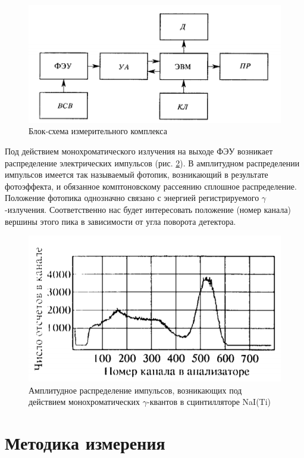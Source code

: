 \documentclass[reprint, nofootinbib, nobalancelastpage, 10pt]{revtex4-2}
\begin{document}
\begin{figure}[h!]
	\includegraphics[width = \linewidth]{pic2.png}
	\caption{Блок-схема измерительного комплекса}
	\label{img:pic2}
\end{figure}

Под действием монохроматического излучения на выходе ФЭУ возникает распределение
электрических импульсов (рис. \ref{img:pic3}). В амплитудном распределении импульсов
имеется так называемый фотопик, возникающий в результате фотоэффекта, и обязанное
комптоновскому рассеянию сплошное распределение. Положение фотопика однозначно связано с
энергией регистрируемого $\gamma$-излучения. Соответственно нас будет интересовать
положение (номер канала) вершины этого пика в зависимости от угла поворота детектора.

\begin{figure}[h!]
	\includegraphics[width = \linewidth]{pic3.png}
	\caption{Амплитудное распределение импульсов, возникающих
		под действием монохроматических $\gamma$-квантов в сцинтилляторе NaI(Ti)}
	\label{img:pic3}
\end{figure}


\section*{Методика измерения}
\end{document}
